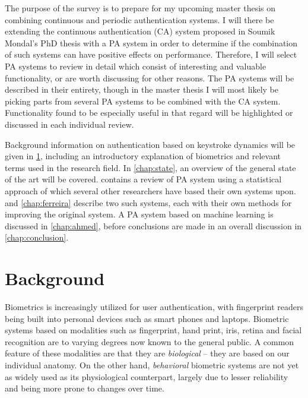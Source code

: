 \documentclass[informationsecurity]{gucmasterproject}
\begin{document}
The purpose of the survey is to prepare for my upcoming master thesis on combining continuous and periodic authentication systems.
I will there be extending the continuous authentication (CA) system proposed in Soumik Mondal's PhD thesis \cite{mondal} with a PA system in order to determine if the combination of such systems can have positive effects on performance.
Therefore, I will select PA systems to review in detail which consist of interesting and valuable functionality, or are worth discussing for other reasons.
The PA systems will be described in their entirety, though in the master thesis I will most likely be picking parts from several PA systems to be combined with the CA system.
Functionality found to be especially useful in that regard will be highlighted or discussed in each individual review.

Background information on authentication based on keystroke dynamics will be given in \cref{chap:background}, including an introductory explanation of biometrics and relevant terms used in the research field.
In \cref{chap:state}, an overview of the general state of the art will be covered.
 contains a review of PA system using a statistical approach of which several other researchers have based their own systems upon.
 and \cref{chap:ferreira} describe two such systems, each with their own methods for improving the original system.
A PA system based on machine learning is discussed in \cref{chap:ahmed}, before conclusions are made in an overall discussion in \cref{chap:conclusion}.


\chapter{Background}
\label{chap:background}

Biometrics is increasingly utilized for user authentication, with fingerprint readers being built into personal devices such as smart phones and laptops.
Biometric systems based on modalities such as fingerprint, hand print, iris, retina and facial recognition are to varying degrees now known to the general public.
A common feature of these modalities are that they are \textit{biological} -- they are based on our individual anatomy.
On the other hand, \textit{behavioral} biometric systems are not yet as widely used as its physiological counterpart, largely due to lesser reliability and being more prone to changes over time.
\end{document}
